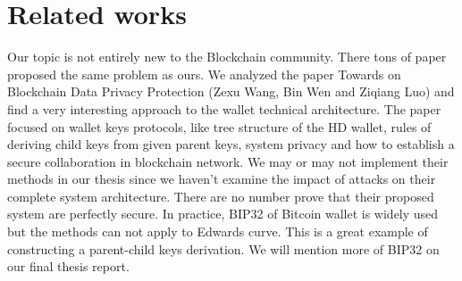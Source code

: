 \chapter{Related works}\label{chap: Related works}
\minitoc

Our topic is not entirely new to the Blockchain community.
There tons of paper proposed the same problem as ours.
We analyzed the paper Towards on Blockchain Data Privacy Protection (Zexu Wang, Bin Wen and Ziqiang Luo) and find a very interesting approach to the wallet technical architecture. 
The paper focused on wallet keys protocols, like tree structure of the HD wallet, rules of deriving child keys from given parent keys, system privacy and how to establish a secure collaboration in blockchain network.
We may or may not implement their methods in our thesis since we haven't examine the impact of attacks on their complete system architecture. There are no number prove that their proposed system are perfectly secure.
In practice, BIP32 of Bitcoin wallet is widely used but the methods can not apply to Edwards curve. 
This is a great example of constructing a parent-child keys derivation. We will mention more of BIP32 on our final thesis report. 
